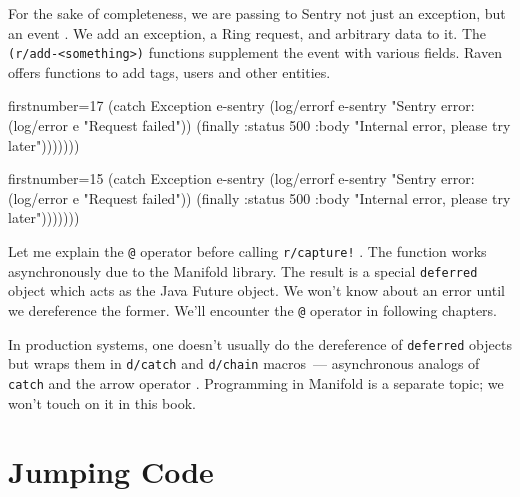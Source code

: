 For the sake of completeness, we are passing to Sentry not just an exception, but an event . We add an exception, a Ring request, and arbitrary data to it. The \verb|(r/add-<something>)| functions supplement the event with various fields. Raven offers functions to add tags, users and other entities.

\wavetop

\ifx\DEVICETYPE\MOBILE

\begin{english}
  \begin{clojure/lines*}{firstnumber=17}
(catch Exception e-sentry
  (log/errorf e-sentry
    "Sentry error: %
  (log/error e "Request failed"))
(finally
  {:status 500
   :body  "Internal error, please try
   later"})))))))
  \end{clojure/lines*}
\end{english}

\else

\begin{english}
  \begin{clojure/lines*}{firstnumber=15}
            (catch Exception e-sentry
              (log/errorf e-sentry "Sentry error: %
              (log/error e "Request failed"))
            (finally
              {:status 500
               :body "Internal error, please try later"})))))))
  \end{clojure/lines*}
\end{english}

\fi


\mnoindent
Let me explain the \verb|@| operator before calling \verb|r/capture!| \ifx\DEVICETYPE\MOBILE{}\else{}\fi. The function works asynchronously due to the Manifold library. The result is a special \verb|deferred| object which acts as the Java Future object. We won't know about an error until we dereference the former. We'll encounter the \verb|@| operator in following chapters.

In production systems, one doesn't usually do the dereference of \verb|deferred| objects but wraps them in \verb|d/catch| and \verb|d/chain| macros~--- asynchronous analogs of \verb|catch| and the arrow operator \arr{}. Programming in Manifold is a separate topic; we won't touch on it in this book.

\section{Jumping Code}

